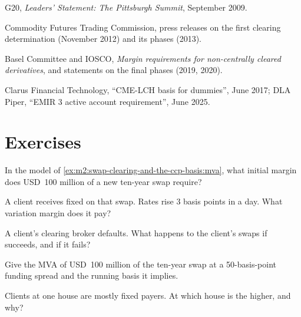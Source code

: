 \begin{omsources}
\item G20, \emph{Leaders' Statement: The Pittsburgh Summit}, September 2009.
\item Commodity Futures Trading Commission, press releases on the first
clearing determination (November 2012) and its phases (2013).
\item Basel Committee and IOSCO, \emph{Margin requirements for non-centrally
cleared derivatives}, and statements on the final phases (2019, 2020).
\item Clarus Financial Technology, ``CME-LCH basis for dummies'', June 2017; DLA
Piper, ``EMIR 3 active account requirement'', June 2025.
\end{omsources}

\section{Exercises}

\begin{exercise}[$\star$]\label{exo:m2:swap-clearing-and-the-ccp-basis:1}
In the model of \cref{ex:m2:swap-clearing-and-the-ccp-basis:mva}, what initial
margin does USD~100 million of a new ten-year swap require?
\end{exercise}

\begin{exercise}[$\star$]\label{exo:m2:swap-clearing-and-the-ccp-basis:2}
A client receives fixed on that swap. Rates rise 3 basis points in a day. What
variation margin does it pay?
\end{exercise}

\begin{exercise}[$\star$]\label{exo:m2:swap-clearing-and-the-ccp-basis:3}
A client's clearing broker defaults. What happens to the client's swaps if
 succeeds, and if it fails?
\end{exercise}

\begin{exercise}[$\star\star$]\label{exo:m2:swap-clearing-and-the-ccp-basis:4}
Give the MVA of USD~100 million of the ten-year swap at a 50-basis-point funding
spread and the running basis it implies.
\end{exercise}

\begin{exercise}[$\star\star$]\label{exo:m2:swap-clearing-and-the-ccp-basis:5}
Clients at one house are mostly fixed payers. At which house is the  higher, and why?
\end{exercise}

